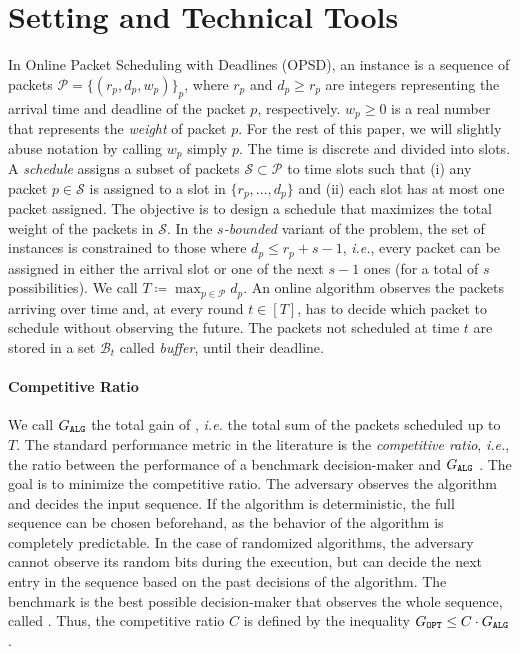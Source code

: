 \section{Setting and Technical Tools}
In Online Packet Scheduling with Deadlines (OPSD), an instance is a sequence of packets $\mathcal{P} = \{(r_{p},d_{p}, w_p)\}_{p}$, where $r_p$ and $d_p \ge r_p$ are integers representing the arrival time and deadline of the packet $p$, respectively. $w_p\ge 0$ is a real number that represents the \textit{weight} of packet $p$. For the rest of this paper, we will slightly abuse notation by calling $w_p$ simply $p$. The time is discrete and divided into slots. A \textit{schedule} assigns a subset of packets $\mathcal{S} \subset \mathcal{P}$ to time slots such that (i) any packet $p \in \mathcal{S}$ is assigned to a slot in $\{r_p, \ldots, d_p\}$ and (ii) each slot has at most one packet assigned. The objective is to design a schedule that maximizes the total weight of the packets in $\mathcal{S}$. In the \textit{$s$-bounded} variant of the problem, the set of instances is constrained to those where $d_p \le r_p+s-1$, \emph{i.e.}, every packet can be assigned in either the arrival slot or one of the next $s-1$ ones (for a total of $s$ possibilities). We call $T \coloneqq \max_{p\in \mathcal{P}} d_p$. An online algorithm \alg observes the packets arriving over time and, at every round $t \in [T]$, has to decide which packet to schedule without observing the future. The packets not scheduled at time $t$ are stored in a set $\mathcal{B}_t$ called \textit{buffer}, until their deadline.
\paragraph{Competitive Ratio } We call $\Galg$ the total gain of \alg, \emph{i.e.} the total sum of the packets scheduled up to $T$.
The standard performance metric in the literature is the \textit{competitive ratio}, \emph{i.e.}, the ratio between the performance of a benchmark decision-maker and $\Galg$ \citep{borodin2005online}. The goal is to minimize the competitive ratio. The adversary observes the algorithm and decides the input sequence. If the algorithm is deterministic, the full sequence can be chosen beforehand, as the behavior of the algorithm is completely predictable. In the case of randomized algorithms, the adversary cannot observe its random bits during the execution, but can decide the next entry in the sequence based on the past decisions of the algorithm. The benchmark is the best possible decision-maker that observes the whole sequence, called \opt. Thus, the competitive ratio $C$ is defined by the inequality $\Gopt \le C\cdot\Galg$. 

